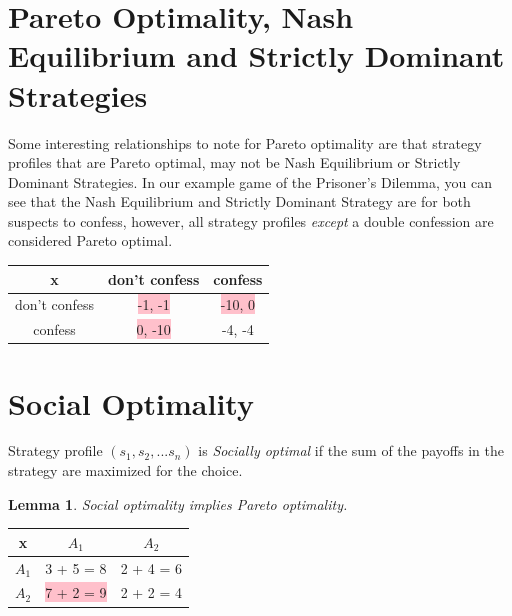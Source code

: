 \documentclass[twoside]{article}
\newtheorem{lemma}[theorem]{Lemma}
\begin{document}
\section{Pareto Optimality, Nash Equilibrium and Strictly Dominant Strategies}
Some interesting relationships to note for Pareto optimality are that strategy profiles that are Pareto optimal, may not be Nash Equilibrium or Strictly Dominant Strategies. In our example game of the Prisoner's Dilemma, you can see that the Nash Equilibrium and Strictly Dominant Strategy are for both suspects to confess, however, all strategy profiles \emph{except} a double confession are considered Pareto optimal.

\begin{left}
\begin{tabular}{|c|c|c|}
\hline
x & don't confess & confess\\
\hline
don't confess & \colorbox{pink}{-1, -1} & \colorbox{pink}{-10, 0}\\
\hline
confess & \colorbox{pink}{0, -10} & -4, -4\\
\hline
\end{tabular}
\end{left}

\section{Social Optimality}
Strategy profile $(s_1, s_2, ...s_n)$ is \emph{Socially optimal } if the sum of the payoffs in the strategy are maximized for the choice.

\begin{lemma}
Social optimality implies Pareto optimality.
\end{lemma}

\begin{left}
\begin{tabular}{|c|c|c|}
\hline
x & $A_1$ & $A_2$\\
\hline
$A_1$ & 3 + 5 = 8 & 2 + 4 = 6\\
\hline
$A_2$ & \colorbox{pink}{7 + 2 = 9} & 2 + 2 = 4\\
\hline
\end{tabular}
\end{left}
\end{document}
